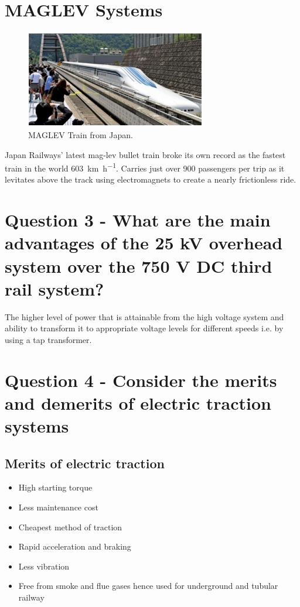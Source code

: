 \section{MAGLEV Systems}
\begin{figure}[H]
    \centering
    \includegraphics[width = 0.7\textwidth]{img/figure147.png}
    \caption{MAGLEV Train from Japan.}
\end{figure}
Japan Railways' latest mag-lev bullet train broke its own record as the fastest train in the world \SI{603}{\kilo\meter\per\hour}. Carries just over 900 passengers per trip as it levitates above the track using electromagnets to create a nearly frictionless ride. 
\section{Question 3 - What are the main advantages of the 25 kV overhead system over the 750 V DC third rail system?}
The higher level of power that is attainable from the high voltage system and ability to transform it to appropriate voltage levels for different speeds i.e. by using a tap transformer. 
\section{Question 4 - Consider the merits and demerits of electric traction systems}
\subsection{Merits of electric traction}
\begin{itemize}
    \item High starting torque
    \item Less maintenance cost
    \item Cheapest method of traction
    \item Rapid acceleration and braking
    \item Less vibration
    \item Free from smoke and flue gases hence used for underground and tubular railway
\end{itemize}

